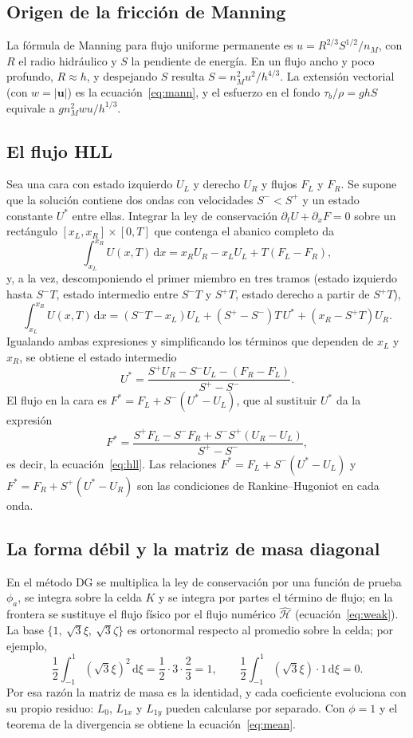 \documentclass[11pt,a4paper]{article}
\newcommand{\dd}{\mathrm d}
\begin{document}
\subsection{Origen de la fricción de Manning}

La fórmula de Manning para flujo uniforme permanente es $u=R^{2/3}S^{1/2}/n_M$, con $R$ el radio hidráulico y
$S$ la pendiente de energía. En un flujo ancho y poco profundo, $R\approx h$, y despejando $S$ resulta
$S=n_M^2u^2/h^{4/3}$. La extensión vectorial (con $w=|\mathbf u|$) es la ecuación~\eqref{eq:mann}, y el esfuerzo
en el fondo $\tau_b/\rho=ghS$ equivale a $gn_M^2wu/h^{1/3}$.

\subsection{El flujo HLL}

Sea una cara con estado izquierdo $U_L$ y derecho $U_R$ y flujos $F_L$ y $F_R$. Se supone que la solución
contiene dos ondas con velocidades $S^-<S^+$ y un estado constante $U^*$ entre ellas. Integrar la ley de
conservación $\partial_tU+\partial_xF=0$ sobre un rectángulo $[x_L,x_R]\times[0,T]$ que contenga el abanico
completo da
\[
  \int_{x_L}^{x_R}U(x,T)\,\dd x=x_RU_R-x_LU_L+T(F_L-F_R),
\]
y, a la vez, descomponiendo el primer miembro en tres tramos (estado izquierdo hasta $S^-T$, estado
intermedio entre $S^-T$ y $S^+T$, estado derecho a partir de $S^+T$),
\[
  \int_{x_L}^{x_R}U(x,T)\,\dd x=(S^-T-x_L)U_L+(S^+-S^-)T\,U^*+(x_R-S^+T)U_R .
\]
Igualando ambas expresiones y simplificando los términos que dependen de $x_L$ y $x_R$, se obtiene el estado
intermedio
\begin{equation}
  U^*=\frac{S^+U_R-S^-U_L-(F_R-F_L)}{S^+-S^-}.
\end{equation}
El flujo en la cara es $F^*=F_L+S^-(U^*-U_L)$, que al sustituir $U^*$ da la expresión
\[
  F^*=\frac{S^+F_L-S^-F_R+S^-S^+(U_R-U_L)}{S^+-S^-},
\]
es decir, la ecuación~\eqref{eq:hll}. Las relaciones $F^*=F_L+S^-(U^*-U_L)$ y $F^*=F_R+S^+(U^*-U_R)$ son las
condiciones de Rankine--Hugoniot en cada onda.

\subsection{La forma débil y la matriz de masa diagonal}

En el método DG se multiplica la ley de conservación por una función de prueba $\phi_a$, se integra sobre la
celda $K$ y se integra por partes el término de flujo; en la frontera se sustituye el flujo físico por el flujo
numérico $\widehat{\mathcal H}$ (ecuación~\eqref{eq:weak}). La base $\{1,\ \sqrt3\xi,\ \sqrt3\zeta\}$ es
ortonormal respecto al promedio sobre la celda; por ejemplo,
\[
  \frac12\int_{-1}^{1}(\sqrt3\xi)^2\,\dd\xi=\frac12\cdot3\cdot\frac23=1,
  \qquad
  \frac12\int_{-1}^{1}(\sqrt3\xi)\cdot1\,\dd\xi=0 .
\]
Por esa razón la matriz de masa es la identidad, y cada coeficiente evoluciona con su propio residuo: $L_0$,
$L_{1x}$ y $L_{1y}$ pueden calcularse por separado. Con $\phi=1$ y el teorema de la divergencia se
obtiene la ecuación~\eqref{eq:mean}.
\end{document}
